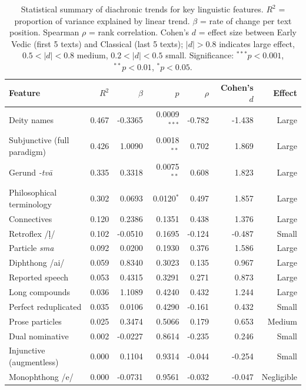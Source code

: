 \begin{table}[ht]
\centering
\caption{Statistical summary of diachronic trends for key linguistic features. $R^2$ = proportion of variance explained by linear trend. $\beta$ = rate of change per text position. Spearman $\rho$ = rank correlation. Cohen's $d$ = effect size between Early Vedic (first 5 texts) and Classical (last 5 texts); $|d| > 0.8$ indicates large effect, $0.5 < |d| < 0.8$ medium, $0.2 < |d| < 0.5$ small. Significance: $^{***}p < 0.001$, $^{**}p < 0.01$, $^{*}p < 0.05$.}
\label{tab:top-features}
\small
\begin{tabular}{lrrrrrr}
\toprule
\textbf{Feature} & \textbf{$R^2$} & \textbf{$\beta$} & \textbf{$p$} & \textbf{$\rho$} & \textbf{Cohen's $d$} & \textbf{Effect} \\
\midrule
Deity names & 0.467 & -0.3365 & 0.0009$^{***}$ & -0.782 & -1.438 & Large \\
Subjunctive (full paradigm) & 0.426 & 1.0090 & 0.0018$^{**}$ & 0.702 & 1.869 & Large \\
Gerund \textit{-tvā} & 0.335 & 0.3318 & 0.0075$^{**}$ & 0.608 & 1.823 & Large \\
Philosophical terminology & 0.302 & 0.0693 & 0.0120$^{*}$ & 0.497 & 1.857 & Large \\
Connectives & 0.120 & 0.2386 & 0.1351 & 0.438 & 1.376 & Large \\
Retroflex /ḷ/ & 0.102 & -0.0510 & 0.1695 & -0.124 & -0.487 & Small \\
Particle \textit{sma} & 0.092 & 0.0200 & 0.1930 & 0.376 & 1.586 & Large \\
Diphthong /ai/ & 0.059 & 0.8340 & 0.3023 & 0.135 & 0.967 & Large \\
Reported speech & 0.053 & 0.4315 & 0.3291 & 0.271 & 0.873 & Large \\
Long compounds & 0.036 & 1.1089 & 0.4240 & 0.432 & 1.244 & Large \\
Perfect reduplicated & 0.035 & 0.0106 & 0.4290 & -0.161 & 0.432 & Small \\
Prose particles & 0.025 & 0.3474 & 0.5066 & 0.179 & 0.653 & Medium \\
Dual nominative & 0.002 & -0.0227 & 0.8614 & -0.235 & 0.246 & Small \\
Injunctive (augmentless) & 0.000 & 0.1104 & 0.9314 & -0.044 & -0.254 & Small \\
Monophthong /e/ & 0.000 & -0.0731 & 0.9561 & -0.032 & -0.047 & Negligible \\
\bottomrule
\end{tabular}
\end{table}